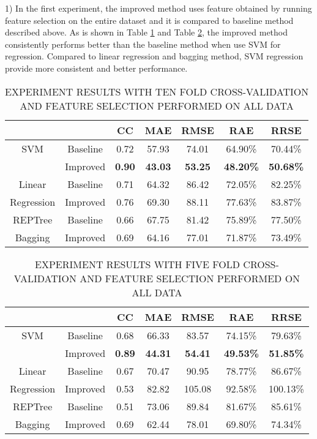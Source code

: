 \documentclass[11pt]{article} %
\begin{document}
1) In the first experiment, the improved method uses feature obtained by running feature selection on the entire dataset and it is compared to baseline method described above. As is shown in Table \ref{tab:result1} and Table \ref{tab:result2}, the improved method consistently performs better than the baseline method when use SVM for regression. Compared to linear regression and bagging method, SVM regression provide more consistent and better performance.

\begin{table}
  \centering
  \caption{EXPERIMENT RESULTS WITH TEN FOLD CROSS-VALIDATION AND FEATURE SELECTION PERFORMED ON ALL DATA}
  \begin{tabular}{|c|c|c|c|c|c|c|}
     \hline
         &       & CC & MAE & RMSE & RAE & RRSE\\
     \hline
     SVM & Baseline & 0.72  & 57.93  & 74.01  & 64.90\%  & 70.44\%\\
         & Improved & \textbf{0.90}  & \textbf{43.03}  & \textbf{53.25}  & \textbf{48.20\%}  & \textbf{50.68\%}\\
     \hline
  Linear & Baseline &  0.71 & 64.32  & 86.42  & 72.05\% & 82.25\%\\
  Regression & Improved & 0.76  & 69.30  & 88.11  & 77.63\%  & 83.87\%  \\
  \hline
  REPTree & Baseline &  0.66 & 67.75  & 81.42  & 75.89\%  & 77.50\%\\
  Bagging & Improved &  0.69 & 64.16  & 77.01  & 71.87\%  & 73.49\%\\
  \hline
  \end{tabular}\label{tab:result1}
\end{table}

\begin{table}
  \centering
  \caption{EXPERIMENT RESULTS WITH FIVE FOLD CROSS-VALIDATION AND FEATURE SELECTION PERFORMED ON ALL DATA}
  \begin{tabular}{|c|c|c|c|c|c|c|}
     \hline
         &       & CC & MAE & RMSE & RAE & RRSE\\
     \hline
     SVM & Baseline & 0.68  & 66.33  & 83.57  & 74.15\%  & 79.63\%\\
         & Improved & \textbf{0.89}  & \textbf{44.31 } & \textbf{54.41}  & \textbf{49.53\% } & \textbf{51.85\%}\\
     \hline
  Linear & Baseline &  0.67 & 70.47  & 90.95  & 78.77\% & 86.67\%\\
  Regression & Improved & 0.53 & 82.82 & 105.08  & 92.58\%  & 100.13\%  \\
  \hline
  REPTree & Baseline &  0.51 & 73.06  & 89.84  & 81.67\%  & 85.61\%\\
  Bagging & Improved &  0.69 & 62.44  & 78.01  & 69.80\%  & 74.34\%\\
  \hline
  \end{tabular}\label{tab:result2}
\end{table}
\end{document}

